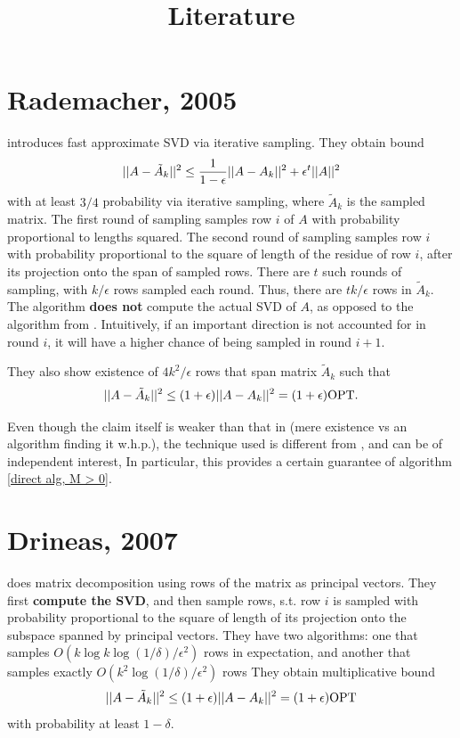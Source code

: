 \documentclass{article}
\title{Literature}
\begin{document}
\maketitle

\section{Rademacher, 2005}
\cite{rademacher2005matrix} introduces fast approximate SVD via iterative sampling. They obtain bound
$$||A - \tilde{A}_k||^2 \leq \frac{1}{1-\epsilon}||A - A_k||^2 + \epsilon^t ||A||^2$$
with at least $3/4$ probability via iterative sampling, where $\tilde{A}_k$ is the sampled matrix. The first round of sampling samples row $i$ of $A$ with probability proportional to lengths squared. The second round of sampling samples row $i$ with probability proportional to the square of length of the residue of row $i$, after its projection onto the span of sampled rows. There are $t$ such rounds of sampling, with $k/\epsilon$ rows sampled each round. Thus, there are $tk/\epsilon$ rows in $\tilde{A}_k$. The algorithm \textbf{does not} compute the actual SVD of $A$, as opposed to the algorithm from \cite{drineas2007relativeerror}. Intuitively, if an important direction is not accounted for in round $i$, it will have a higher chance of being sampled in round $i+1$.

They also show existence of $4k^2/\epsilon$ rows that span matrix $\tilde{A}_k$ such that 
$$||A - \tilde{A}_k||^2 \leq (1+\epsilon)||A - A_k||^2 = (1+\epsilon)\text{OPT}.$$

Even though the claim itself is weaker than that in \cite{drineas2007relativeerror} (mere existence vs an algorithm finding it w.h.p.), the technique used is different from \cite{drineas2007relativeerror}, and can be of independent interest, In particular, this provides a certain guarantee of algorithm \ref{direct alg, M > 0}.

\section{Drineas, 2007}
\cite{drineas2007relativeerror} does matrix decomposition using rows of the matrix as principal vectors. They first \textbf{compute the SVD}, and then sample rows, s.t. row $i$ is sampled with probability proportional to the square of length of its projection onto the subspace spanned by principal vectors. They have two algorithms: one that samples $O(k\log k \log(1/\delta)/\epsilon^2)$ rows in expectation, and another that samples exactly $O(k^2\log(1/\delta)/\epsilon^2)$ rows 
They obtain multiplicative bound 
$$||A - \tilde{A}_k||^2 \leq (1+\epsilon)||A - A_k||^2 = (1+\epsilon)\text{OPT}$$ with probability at least $1-\delta$.
\end{document}
